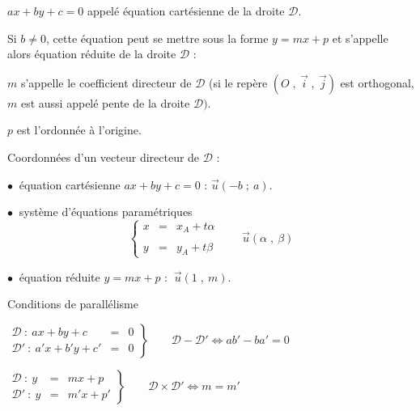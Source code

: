 \documentclass{article}
\begin{document}
		$ax+by+c=0$ appelé équation cartésienne de la droite $\mathcal{D}.$
		
		Si $b\neq 0$, cette équation peut se mettre sous la forme $y=mx+p$ et s'appelle alors équation réduite de la droite $\mathcal{D}$ : 
		
		$m$ s'appelle le coefficient directeur de $\mathcal{D}$ (si le repère $(O\;,\ \vec{i}\;,\ \vec{j})$ est orthogonal, $m$ est aussi appelé pente de la droite $\mathcal{D}).$ 
		
		$p$ est l'ordonnée à l'origine.
		
		Coordonnées d'un vecteur directeur de $\mathcal{D}$ :
		
		$\bullet\ $ équation cartésienne $ax+by+c=0$ : $\overrightarrow{u}(-b\;;\ a).$
		
		$\bullet\ $ système d'équations paramétriques $$\left\lbrace\begin{array}{lcl} x& = & x_{A}+t\alpha\\ \\ y& =& y_{A}+t\beta \end{array}\qquad \vec{u}(\alpha\;,\ \beta)\right.$$
		
		$\bullet\ $ équation réduite $y=mx+p$ : $\ \vec{u}(1\;,\ m).$
		
		Conditions de parallélisme
		
		$\left.\begin{array}{lcl} \mathcal{D}\ :\ ax+by+c& = &0\\ \mathcal{D'}\ :\ a'x+b'y+c'& = &0 \end{array}\right\rbrace\qquad\mathcal{D}-\mathcal{D'}\Leftrightarrow ab'-ba'=0$
		
		$\left.\begin{array}{lcl} \mathcal{D}\ :\ y& =& mx+p\\ \mathcal{D'}\ :\ y& =& m'x+p' \end{array}\right\rbrace\qquad\mathcal{D}\times\mathcal{D'}\Leftrightarrow m=m'$
		
\end{document}
